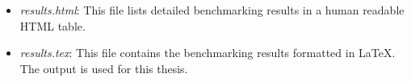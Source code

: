 \begin{itemize}
\begin{itemize}
	\item \textit{results.html}: This file lists detailed benchmarking results in a human readable \gls{HTML} table. 
	
	\item \textit{results.tex}: This file contains the benchmarking results formatted in LaTeX. The output is used for this thesis.
	\end{itemize}

\end{itemize}

